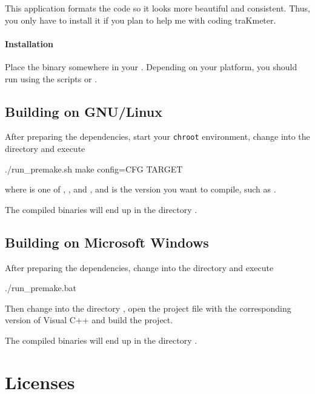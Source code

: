 This application formats the code so it looks more beautiful and
consistent.  Thus, you only have to install it if you plan to help me
with coding traKmeter.

\subsubsection{Installation}

Place the binary somewhere in your .  Depending on your
platform, you should run  using the scripts
 or .

\section{Building on GNU/Linux}

After preparing the dependencies, start your \texttt{chroot}
environment, change into the directory  and execute

\begin{VerbatimBoth}
  ./run_premake.sh
  make config=CFG TARGET
\end{VerbatimBoth}

where  is one of ,
,  and
, and  is the version
you want to compile, such as .

The compiled binaries will end up in the directory .

\section{Building on Microsoft Windows}

After preparing the dependencies, change into the directory
 and execute

\begin{VerbatimBoth}
  ./run_premake.bat
\end{VerbatimBoth}

Then change into the directory , open the
project file with the corresponding version of Visual C++ and build
the project.

The compiled binaries will end up in the directory .

\chapter{Licenses}

\scriptsize

\normalsize

\scriptsize

\normalsize




